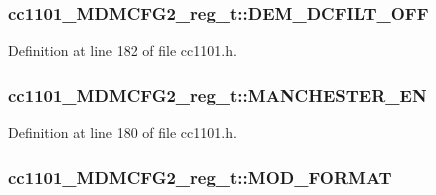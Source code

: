 \subsubsection[{\texorpdfstring{D\+E\+M\+\_\+\+D\+C\+F\+I\+L\+T\+\_\+\+O\+FF}{DEM_DCFILT_OFF}}]{ cc1101\+\_\+\+M\+D\+M\+C\+F\+G2\+\_\+reg\+\_\+t\+::\+D\+E\+M\+\_\+\+D\+C\+F\+I\+L\+T\+\_\+\+O\+FF}\hypertarget{structcc1101___m_d_m_c_f_g2__reg__t_ad81d642c0b40b489cf874a3096962a0a}{}\label{structcc1101___m_d_m_c_f_g2__reg__t_ad81d642c0b40b489cf874a3096962a0a}


Definition at line 182 of file cc1101.\+h.

\subsubsection[{\texorpdfstring{M\+A\+N\+C\+H\+E\+S\+T\+E\+R\+\_\+\+EN}{MANCHESTER_EN}}]{ cc1101\+\_\+\+M\+D\+M\+C\+F\+G2\+\_\+reg\+\_\+t\+::\+M\+A\+N\+C\+H\+E\+S\+T\+E\+R\+\_\+\+EN}\hypertarget{structcc1101___m_d_m_c_f_g2__reg__t_a92c56c2b9008dfe53bda6b23361f6fe5}{}\label{structcc1101___m_d_m_c_f_g2__reg__t_a92c56c2b9008dfe53bda6b23361f6fe5}


Definition at line 180 of file cc1101.\+h.

\subsubsection[{\texorpdfstring{M\+O\+D\+\_\+\+F\+O\+R\+M\+AT}{MOD_FORMAT}}]{ cc1101\+\_\+\+M\+D\+M\+C\+F\+G2\+\_\+reg\+\_\+t\+::\+M\+O\+D\+\_\+\+F\+O\+R\+M\+AT}\hypertarget{structcc1101___m_d_m_c_f_g2__reg__t_a4b83a96a1f6584ce8eeac467d8c99b13}{}\label{structcc1101___m_d_m_c_f_g2__reg__t_a4b83a96a1f6584ce8eeac467d8c99b13}


